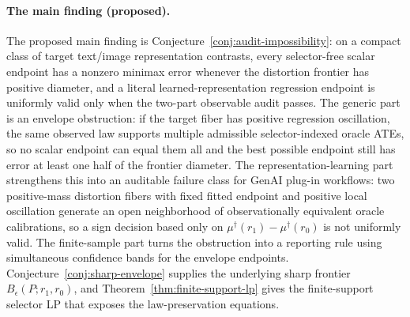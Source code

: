 \documentclass[11pt]{article}
\theoremstyle{definition}
\theoremstyle{plain}
\theoremstyle{remark}
\begin{document}
\paragraph{The main finding (proposed).}
The proposed main finding is Conjecture~\ref{conj:audit-impossibility}: on a compact class of target text/image representation contrasts, every selector-free scalar endpoint has a nonzero minimax error whenever the distortion frontier has positive diameter, and a literal learned-representation regression endpoint is uniformly valid only when the two-part observable audit passes.  The generic part is an envelope obstruction: if the target fiber has positive regression oscillation, the same observed law supports multiple admissible selector-indexed oracle ATEs, so no scalar endpoint can equal them all and the best possible endpoint still has error at least one half of the frontier diameter.  The representation-learning part strengthens this into an auditable failure class for GenAI plug-in workflows: two positive-mass distortion fibers with fixed fitted endpoint and positive local oscillation generate an open neighborhood of observationally equivalent oracle calibrations, so a sign decision based only on \(\mu^\dagger(r_1)-\mu^\dagger(r_0)\) is not uniformly valid.  The finite-sample part turns the obstruction into a reporting rule using simultaneous confidence bands for the envelope endpoints.  Conjecture~\ref{conj:sharp-envelope} supplies the underlying sharp frontier \(B_\epsilon(P;r_1,r_0)\), and Theorem~\ref{thm:finite-support-lp} gives the finite-support selector LP that exposes the law-preservation equations.
\end{document}
